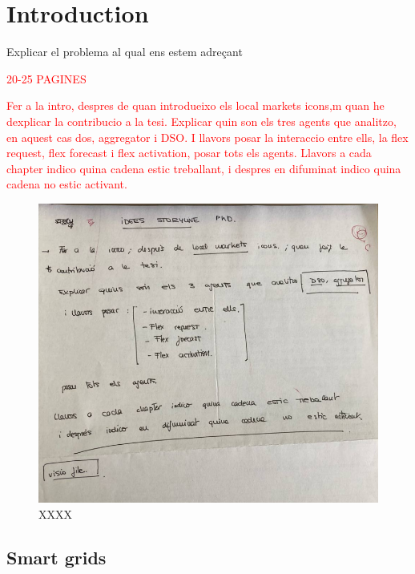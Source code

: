 \renewcommand\labelenumi{(\roman{enumi})}
\renewcommand\theenumi\labelenumi

\chapter{Introduction}
\label{chapterIntro}

Explicar el problema al qual ens estem adre\c{c}ant 

\textcolor{red}{20-25 PAGINES}

\textcolor{red}{Fer a la intro, despres de quan introdueixo els local markets icons,m quan he dexplicar la contribucio a la tesi. Explicar quin son els tres agents que analitzo, en aquest cas dos, aggregator i DSO. I llavors posar la interaccio entre ells, la flex request, flex forecast i flex activation, posar tots els agents. Llavors a cada chapter indico quina cadena estic treballant, i despres en difuminat indico quina cadena no estic activant.}

\begin{figure}[]
	\centering
	\includegraphics[width=1\columnwidth ]{ChapterIntro/Figures/idea.png}
		\caption{XXXX}  
\end{figure}


\section{Smart grids}

